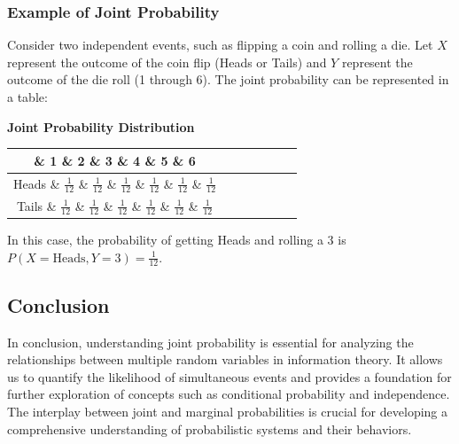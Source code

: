 \documentclass[a4paper]{article}
\newcommand{\toprule}{\hline}
\newcommand{\midrule}{\hline}
\newcommand{\bottomrule}{\hline}
\newenvironment{customtable}[3][htbp]{%
  \begin{table}
  \centering
  \renewcommand{\arraystretch}{1.2}
  \textbf{#3}\par\smallskip
  \begin{tabular}{#2}
}{%
  \end{tabular}
  \end{table}
}
\begin{document}
\subsubsection{Example of Joint Probability}
Consider two independent events, such as flipping a coin and rolling a die. Let \( X \) represent the outcome of the coin flip (Heads or Tails) and \( Y \) represent the outcome of the die roll (1 through 6). The joint probability can be represented in a table:

\begin{customtable}[h]{|c|c|c|c|c|c|c|}{Joint Probability Distribution}
\toprule
    \& 1 \& 2 \& 3 \& 4 \& 5 \& 6 \\
\midrule
Heads \& \( \frac{1}{12} \) \& \( \frac{1}{12} \) \& \( \frac{1}{12} \) \& \( \frac{1}{12} \) \& \( \frac{1}{12} \) \& \( \frac{1}{12} \) \\
\midrule
Tails \& \( \frac{1}{12} \) \& \( \frac{1}{12} \) \& \( \frac{1}{12} \) \& \( \frac{1}{12} \) \& \( \frac{1}{12} \) \& \( \frac{1}{12} \) \\
\bottomrule
\end{customtable}

In this case, the probability of getting Heads and rolling a 3 is \( P(X = \text{Heads}, Y = 3) = \frac{1}{12} \).

\subsection{Conclusion}
In conclusion, understanding joint probability is essential for analyzing the relationships between multiple random variables in information theory. It allows us to quantify the likelihood of simultaneous events and provides a foundation for further exploration of concepts such as conditional probability and independence. The interplay between joint and marginal probabilities is crucial for developing a comprehensive understanding of probabilistic systems and their behaviors.
\end{document}
